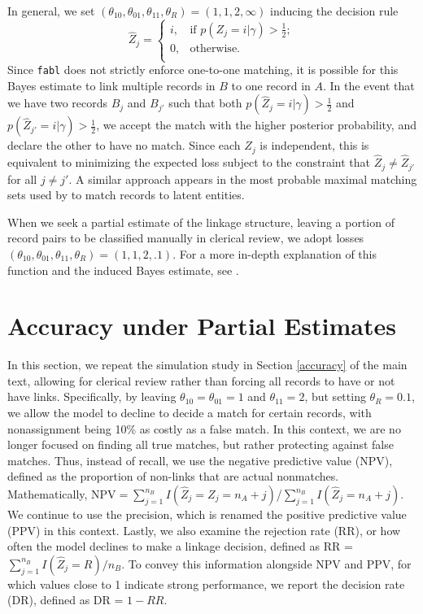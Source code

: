 \documentclass[ba]{imsart}
\begin{document}
In general, we set $(\theta_{10}, \theta_{01}, \theta_{11}, \theta_R) = (1, 1, 2, \infty)$ inducing the decision rule
	$$\hat{Z}_j =\begin{cases} 
		i,  & \text{if } p(Z_j = i |\gamma) > \frac{1}{2}; \\
		0,  & \text{otherwise}. \\
	\end{cases}$$
Since \texttt{fabl} does not strictly enforce one-to-one matching, it is possible for this Bayes estimate to link multiple records in $B$ to one record in $A$. In the event that we have two records $B_j$ and $B_{j'}$ such that both $p(\hat{Z}_j = i |\gamma) > \frac{1}{2}$ and $ p(\hat{Z}_{j'} = i |\gamma) > \frac{1}{2}$, we accept the match with the higher posterior probability, and declare the other to have no match. Since each $Z_j$ is independent, this is equivalent to minimizing the expected loss subject to the constraint that $\hat{Z}_j \neq \hat{Z}_{j'}$ for all $j \neq j'$.  A similar approach appears in the most probable maximal matching sets used by \cite{steorts_bayesian_2016} to match records to latent entities.

When we seek a partial estimate of the linkage structure, leaving a portion of record pairs to be classified manually in clerical review, we adopt losses $(\theta_{10}, \theta_{01}, \theta_{11}, \theta_R) = (1, 1, 2, .1)$. For a more in-depth explanation of this function and the induced Bayes estimate, see \cite{sadinle_bayesian_2017}.


	\hypertarget{partial}{%
	\section{Accuracy under Partial Estimates}\label{partial}}

In this section, we repeat the simulation study in Section \ref{accuracy} of the main text, allowing for clerical review rather than forcing all records to have or not have links.  Specifically, by leaving $\theta_{10} = \theta_{01} = 1$ and $\theta_{11} = 2$, but setting $\theta_R = 0.1$, we allow the model to decline to decide a match for certain records, with nonassignment being 10\% as costly as a false match. In this context, we are no longer focused on finding all true matches, but rather protecting against false matches. Thus, instead of recall, we use the negative predictive value (NPV), defined as the proportion of non-links that are actual nonmatches. Mathematically, $\text{NPV} = \sum_{j=1}^{n_B} I(\hat{Z}_j = Z_j = n_A + j)$/$\sum_{j=1}^{n_B} I(\hat{Z}_j = n_A + j)$. We continue to use the precision, which is renamed the positive predictive value (PPV) in this context. Lastly, we also examine the rejection rate (RR), or how often the model declines to make a linkage decision, defined as RR = $\sum_{j=1}^{n_B} I(\hat{Z}_j = R)/n_B$. To convey this information alongside NPV and PPV, for which values close to 1 indicate strong performance, we report the decision rate (DR), defined as DR = $1 - RR$.
\end{document}
